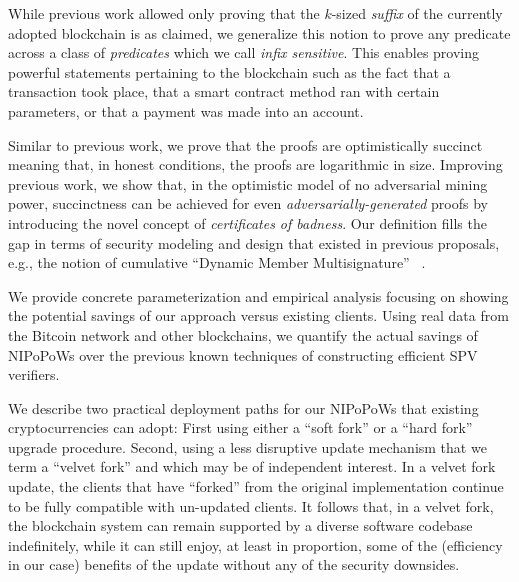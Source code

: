 While previous work allowed only proving that the $k$-sized \emph{suffix} of the
currently adopted blockchain is as claimed, we generalize this notion to prove
any predicate across a class of \emph{predicates} which we call \emph{infix
sensitive}. This enables proving powerful statements pertaining to the
blockchain such as the fact that a transaction took place, that a smart contract
method ran with certain parameters, or that a payment was made into an account.

Similar to previous work, we prove that the proofs are optimistically
succinct meaning that, in honest conditions, the proofs are logarithmic in size.
Improving previous work, we show that, in the optimistic model of no adversarial
mining power, succinctness can be achieved for even
\textit{adversarially-generated} proofs by introducing the novel concept of
\textit{certificates of badness}. Our definition fills the gap in terms of
security modeling and design that existed in previous proposals, e.g., the
notion of cumulative ``Dynamic Member Multisignature'' ~\cite{sidechains}.

We provide concrete parameterization and empirical analysis focusing on showing
the potential savings of our approach versus existing clients. Using real data
from the Bitcoin network and other blockchains, we quantify the actual savings of
NIPoPoWs over the previous known techniques of constructing efficient SPV
verifiers.

We describe two practical deployment paths for our NIPoPoWs that existing
cryptocurrencies can adopt: First using either a ``soft fork'' or a ``hard
fork'' upgrade procedure. Second, using a less disruptive update mechanism
that we term a ``velvet fork'' and which may be of independent interest. In a
velvet fork update, the clients that have ``forked'' from the original
implementation continue to be fully compatible with un-updated clients. It
follows that, in a velvet fork, the blockchain system can remain supported by a
diverse software codebase indefinitely, while it can still enjoy, at least in
proportion, some of the (efficiency in our case) benefits of the update without
any of the security downsides.

